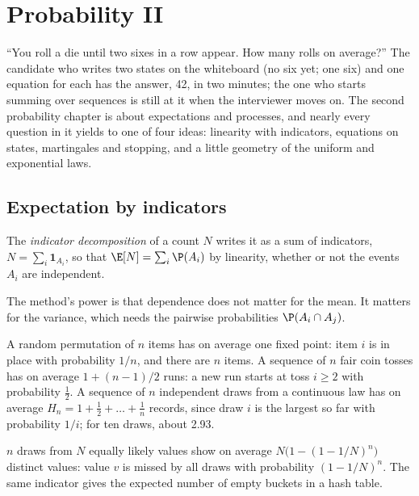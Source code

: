 \chapter{Probability II}\label{ch:iv:probability-ii}

``You roll a die until two sixes in a row appear. How many rolls on average?'' The candidate who writes two
states on the whiteboard (no six yet; one six) and one equation for each has the answer, 42, in two minutes;
the one who starts summing over sequences is still at it when the interviewer moves on. The second
probability chapter is about expectations and processes, and nearly every question in it yields to one of four
ideas: linearity with indicators, equations on states, martingales and stopping, and a little geometry of the
uniform and exponential laws.

\section{Expectation by indicators}

\begin{definition}\label{def:iv:probability-ii:indicators}
The \emph{indicator decomposition} of a count $N$ writes it as a sum of
indicators, $N = \sum_i \mathbf 1_{A_i}$, so that $\E[N] = \sum_i \P(A_i)$ by linearity, whether or not the
events $A_i$ are independent.
\end{definition}

The method's power is that dependence does not matter for the mean. It matters for the variance, which needs the
pairwise probabilities $\P(A_i \cap A_j)$.

\begin{example}\label{ex:iv:probability-ii:indicators}
A random permutation of $n$ items has on average one fixed point: item $i$ is in place with probability $1/n$,
and there are $n$ items. A sequence of $n$ fair coin tosses has on average $1 + (n-1)/2$ runs: a new run starts
at toss $i \ge 2$ with probability $\tfrac12$. A sequence of $n$ independent draws from a continuous law has on
average $H_n = 1 + \tfrac12 + \dots + \tfrac1n$ records, since draw $i$ is the largest so far with probability
$1/i$; for ten draws, about 2.93.
\end{example}

\begin{example}\label{ex:iv:probability-ii:distinct}
$n$ draws from $N$ equally likely values show on average $N\big(1 - (1 - 1/N)^n\big)$ distinct values:
value $v$ is missed by all draws with probability $(1-1/N)^n$. The same indicator gives the expected number of
empty buckets in a hash table.
\end{example}

